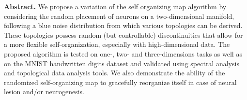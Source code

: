 %

\textbf{Abstract.} We propose a variation of the self organizing map algorithm by considering the random placement of neurons on a two-dimensional manifold, following a blue noise distribution from which various topologies can be derived. These topologies possess random (but controllable) discontinuities that allow for a more flexible self-organization, especially with high-dimensional data. The proposed algorithm is tested on one-, two- and three-dimensions tasks as well as on the MNIST handwritten digits dataset and validated using spectral analysis and topological data analysis tools. We also demonstrate the ability of the randomized self-organizing map to gracefully reorganize itself in case of neural lesion and/or neurogenesis.\par

